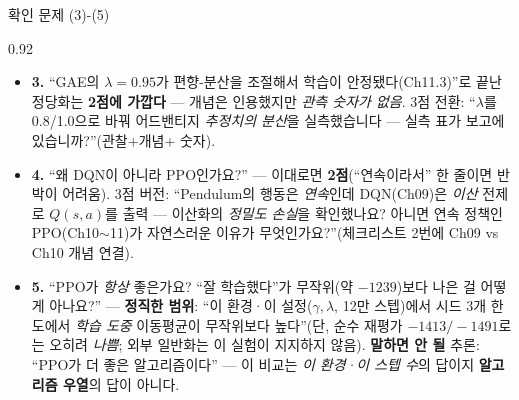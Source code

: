 \begin{frame}{확인 문제 (3)-(5)}
\begin{center}\begin{varwidth}{0.92\textwidth}
  \small
  \begin{itemize}
    \item \textbf{3.} ``GAE의 $\lambda=0.95$가 편향-분산을 조절해서
      학습이 안정됐다(Ch11.3)''로 끝난 정당화는 \textbf{2점에
      가깝다} — 개념은 인용했지만 \emph{관측 숫자가 없음}. 3점
      전환: ``$\lambda$를 0.8/1.0으로 바꿔 어드밴티지 \emph{추정치의
      분산}을 실측했습니다 — 실측 표가 보고에 있습니까?''(관찰+개념+
      숫자).
    \item \textbf{4.} ``왜 DQN이 아니라 PPO인가요?'' — 이대로면
      \textbf{2점}(``연속이라서'' 한 줄이면 반박이 어려움). 3점
      버전: ``Pendulum의 행동은 \emph{연속}인데 DQN(Ch09)은 \emph{이산}
      전제로 $Q(s,a)$를 출력 — 이산화의 \emph{정밀도 손실}을 확인했나요?
      아니면 연속 정책인 PPO(Ch10$\sim$11)가 자연스러운 이유가
      무엇인가요?''(체크리스트 2번에 Ch09 vs Ch10 개념 연결).
    \item \textbf{5.} ``PPO가 \emph{항상} 좋은가요? ``잘 학습했다''가
      무작위(약 $-1239$)보다 나은 걸 어떻게 아나요?'' — \textbf{정직한
      범위}: ``이 환경·이 설정($\gamma, \lambda$, 12만 스텝)에서 시드 3개
      한도에서 \emph{학습 도중} 이동평균이 무작위보다 높다''(단, 순수
      재평가 $-1413/-1491$로는 오히려 \emph{나쁨}; 외부 일반화는 이
      실험이 지지하지 않음). \textbf{말하면 안 될} 추론: ``PPO가 더 좋은
      알고리즘이다'' — 이 비교는 \emph{이 환경·이 스텝 수}의 답이지
      \textbf{알고리즘 우열}의 답이 아니다.
  \end{itemize}
\end{varwidth}\end{center}
\end{frame}
